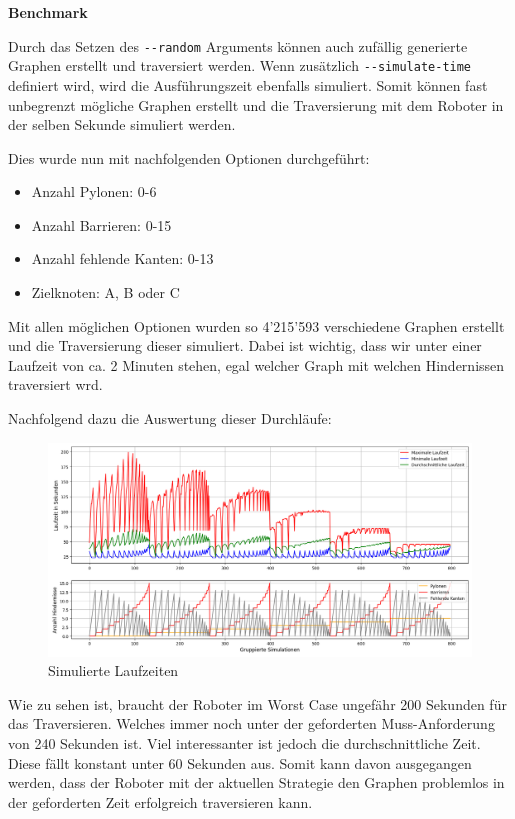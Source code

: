 \textbf{Benchmark}

Durch das Setzen des \verb|--random| Arguments können auch zufällig generierte Graphen erstellt und traversiert werden.
Wenn zusätzlich \verb|--simulate-time| definiert wird, wird die Ausführungszeit ebenfalls simuliert.
Somit können fast unbegrenzt mögliche Graphen erstellt und die Traversierung mit dem Roboter in der selben Sekunde simuliert werden.

Dies wurde nun mit nachfolgenden Optionen durchgeführt:

\begin{itemize}
  \item Anzahl Pylonen: 0-6
  \item Anzahl Barrieren: 0-15
  \item Anzahl fehlende Kanten: 0-13
  \item Zielknoten: A, B oder C
\end{itemize}

Mit allen möglichen Optionen wurden so 4'215'593 verschiedene Graphen erstellt und die Traversierung dieser simuliert.
Dabei ist wichtig, dass wir unter einer Laufzeit von ca. 2 Minuten stehen, egal welcher Graph mit welchen Hindernissen traversiert wrd.

Nachfolgend dazu die Auswertung dieser Durchläufe:

\begin{figure}[H]
  \centering\includegraphics[width=\linewidth]{assets/informatik-prototyp/simulator/simulations_chart_sm.png}
  \caption{Simulierte Laufzeiten}
  \label{fig:simulation-run-chart}
\end{figure}

Wie zu sehen ist, braucht der Roboter im Worst Case ungefähr 200 Sekunden für das Traversieren. Welches immer noch unter der geforderten Muss-Anforderung von 240 Sekunden ist. 
Viel interessanter ist jedoch die durchschnittliche Zeit. Diese fällt konstant unter 60 Sekunden aus.
Somit kann davon ausgegangen werden, dass der Roboter mit der aktuellen Strategie den Graphen problemlos in der geforderten Zeit erfolgreich traversieren kann.
